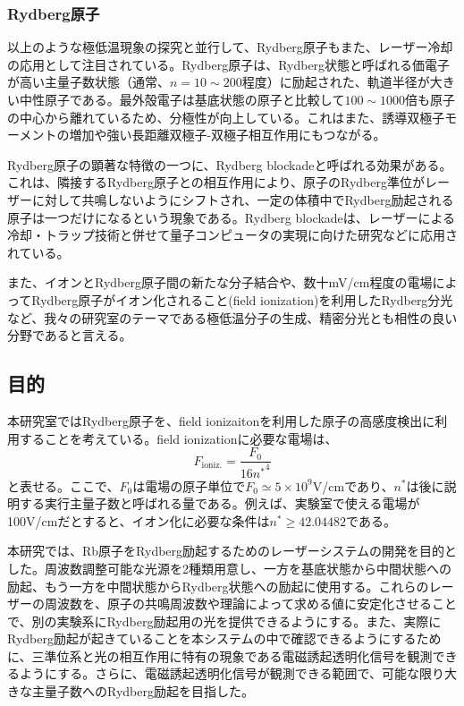 \documentclass[dvipdfmx]{jsarticle}
\begin{document}
\subsubsection{Rydberg原子}
以上のような極低温現象の探究と並行して、Rydberg原子もまた、レーザー冷却の応用として注目されている。Rydberg原子は、Rydberg状態と呼ばれる価電子が高い主量子数状態（通常、$n=10\sim200$程度）に励起された、軌道半径が大きい中性原子である。最外殻電子は基底状態の原子と比較して$100\sim1000$倍も原子の中心から離れているため、分極性が向上している\cite{rydberg}。これはまた、誘導双極子モーメントの増加や強い長距離双極子-双極子相互作用にもつながる。

Rydberg原子の顕著な特徴の一つに、Rydberg blockadeと呼ばれる効果がある。これは、隣接するRydberg原子との相互作用により、原子のRydberg準位がレーザーに対して共鳴しないようにシフトされ、一定の体積中でRydberg励起される原子は一つだけになるという現象である。Rydberg blockadeは、レーザーによる冷却・トラップ技術と併せて量子コンピュータの実現に向けた研究などに応用されている。\cite{yuma}

また、イオンとRydberg原子間の新たな分子結合\cite{ion-rydberg}や、数十mV/cm程度の電場によってRydberg原子がイオン化されること(field ionization)を利用したRydberg分光\cite{yuma}など、我々の研究室のテーマである極低温分子の生成、精密分光とも相性の良い分野であると言える。
\subsection{目的}
本研究室ではRydberg原子を、field ionizaitonを利用した原子の高感度検出に利用することを考えている。field ionizationに必要な電場は、
\begin{equation}
    F_{\text{ioniz.}} = \frac{F_0}{16 {n^*}^4}
\end{equation}
と表せる。\cite{rucas}ここで、$F_0$は電場の原子単位で$F_0 \simeq 5 \times 10^9$V/cmであり、$n^*$は後に説明する実行主量子数と呼ばれる量である。例えば、実験室で使える電場が100V/cmだとすると、イオン化に必要な条件は$n^* \geq 42.04482$である。

本研究では、Rb原子をRydberg励起するためのレーザーシステムの開発を目的とした。周波数調整可能な光源を2種類用意し、一方を基底状態から中間状態への励起、もう一方を中間状態からRydberg状態への励起に使用する。これらのレーザーの周波数を、原子の共鳴周波数や理論によって求める値に安定化させることで、別の実験系にRydberg励起用の光を提供できるようにする。また、実際にRydberg励起が起きていることを本システムの中で確認できるようにするために、三準位系と光の相互作用に特有の現象である電磁誘起透明化信号を観測できるようにする。さらに、電磁誘起透明化信号が観測できる範囲で、可能な限り大きな主量子数へのRydberg励起を目指した。
\end{document}
